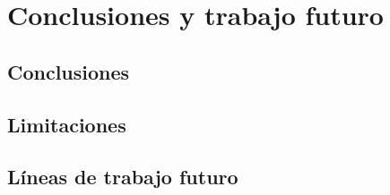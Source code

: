 \chapter{Conclusiones y trabajo futuro}
\label{cap:conclusiones}


\section{Conclusiones}

\section{Limitaciones}

\section{Líneas de trabajo futuro}
